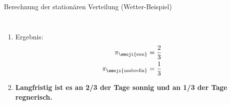 \begin{frame}{Berechnung der stationären Verteilung (Wetter-Beispiel)}
\begin{columns}
\begin{enumerate}[<+->]
\[\begin{aligned}
                          3 \cdot \pi_{\text{\emoji{umbrella}}}                                 & = 1           \\
                          \pi_{\text{\emoji{umbrella}}}                                         & = \frac{1}{3}
                      \end{aligned}
                  \]
            \item Ergebnis:
                  \[
                      \begin{aligned}
                          \pi_{\text{\emoji{sun}}}      & = \frac{2}{3} \\
                          \pi_{\text{\emoji{umbrella}}} & = \frac{1}{3}
                      \end{aligned}
                  \]
            \item[$\Rightarrow$] \textbf{Langfristig ist es an 2/3 der Tage sonnig und an 1/3 der Tage regnerisch.}
        \end{enumerate}

    \end{columns}
\end{frame}